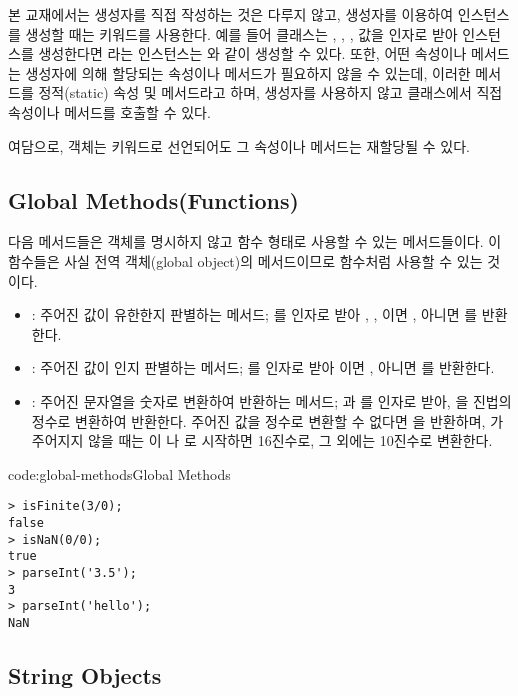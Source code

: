 본 교재에서는 생성자를 직접 작성하는 것은 다루지 않고, 생성자를 이용하여 인스턴스를 생성할 때는  키워드를 사용한다. 예를 들어  클래스는 , , ,  값을 인자로 받아 인스턴스를 생성한다면 라는 인스턴스는 와 같이 생성할 수 있다. 또한, 어떤 속성이나 메서드는 생성자에 의해 할당되는 속성이나 메서드가 필요하지 않을 수 있는데, 이러한 메서드를 정적(static) 속성 및 메서드라고 하며, 생성자를 사용하지 않고 클래스에서 직접 속성이나 메서드를 호출할 수 있다.

여담으로, 객체는  키워드로 선언되어도 그 속성이나 메서드는 재할당될 수 있다.

\subsection*{Global Methods(Functions)}

다음 메서드들은 객체를 명시하지 않고 함수 형태로 사용할 수 있는 메서드들이다. 이 함수들은 사실 전역 객체(global object)의 메서드이므로 함수처럼 사용할 수 있는 것이다.

\begin{itemize}
    \item {}: 주어진 값이 유한한지 판별하는 메서드; 를 인자로 받아 , , 이면 , 아니면 를 반환한다.
    \item {}: 주어진 값이 인지 판별하는 메서드; 를 인자로 받아 이면 , 아니면 를 반환한다.
    \item {}: 주어진 문자열을 숫자로 변환하여 반환하는 메서드; 과 를 인자로 받아, 을 진법의 정수로 변환하여 반환한다. 주어진 값을 정수로 변환할 수 없다면 을 반환하며, 가 주어지지 않을 때는 이 나 로 시작하면 16진수로, 그 외에는 10진수로 변환한다.
\end{itemize}

\begin{codeenv}{code:global-methods}{Global Methods}\begin{verbatim}
> isFinite(3/0);
false
> isNaN(0/0);
true
> parseInt('3.5');
3
> parseInt('hello');
NaN
\end{verbatim}
\end{codeenv}

\subsection*{String Objects}

